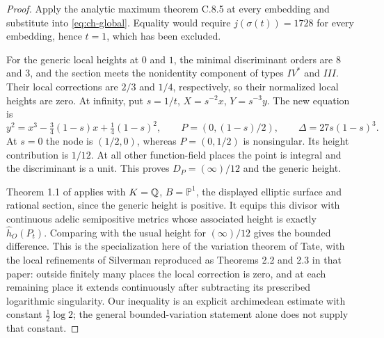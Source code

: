 \begin{proof}
Apply the analytic maximum theorem C.8.5 at every embedding
and substitute into \eqref{eq:ch-global}. Equality would
require $j(\sigma(t))=1728$ for every embedding, hence $t=1$,
which has been excluded.

For the generic local heights at $0$ and $1$, the minimal
discriminant orders are $8$ and $3$, and the section meets
the nonidentity component of types $IV^*$ and $III$.
Their local corrections are $2/3$ and $1/4$, respectively,
so their normalized local heights are zero. At infinity,
put $s=1/t$, $X=s^{-2}x$, $Y=s^{-3}y$. The new equation is
\[
 y^2=x^3-\tfrac34(1-s)x+\tfrac14(1-s)^2,
 \qquad P=(0,(1-s)/2),\qquad\Delta=27s(1-s)^3.
\]
At $s=0$ the node is $(1/2,0)$, whereas $P=(0,1/2)$ is
nonsingular. Its height contribution is $1/12$.
At all other function-field places the point is integral
and the discriminant is a unit. This proves
$D_P=(\infty)/12$ and the generic height.

Theorem 1.1 of \citet{demarco2017} applies with $K=\mathbb Q$,
$B=\mathbb P^1$, the displayed elliptic surface and rational
section, since the generic height is positive. It equips
this divisor with continuous adelic semipositive metrics
whose associated height is exactly $\widehat h_O(P_t)$.
Comparing with the usual height for $(\infty)/12$ gives the
bounded difference. This is the specialization here of the
variation theorem of Tate, with the local refinements of
Silverman reproduced as Theorems 2.2 and 2.3 in that paper:
outside finitely many places the local correction is zero,
and at each remaining place it extends continuously after
subtracting its prescribed logarithmic singularity.
Our inequality is an explicit archimedean estimate with
constant $\frac12\log2$; the general bounded-variation
statement alone does not supply that constant.


\end{proof}
